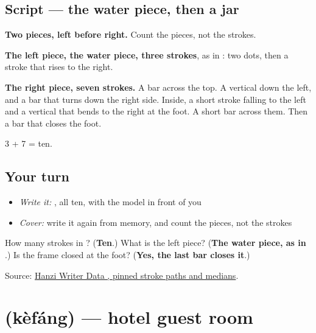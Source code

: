 \subsection*{Script — the water piece, then a jar}

\begin{quote}
\end{quote}

\textbf{Two pieces, left before right.} Count the pieces, not the strokes.

\textbf{The left piece, the water piece, three strokes}, as in : two dots, then a stroke that rises to the right.

\textbf{The right piece, seven strokes.} A bar across the top. A vertical down the left, and a bar that turns down the right side. Inside, a short stroke falling to the left and a vertical that bends to the right at the foot. A short bar across them. Then a bar that closes the foot.

3 + 7 = ten.

\subsection*{Your turn}
\begin{itemize}
\raggedright
  \item \emph{Write it:} , all ten, with the model in front of you
  \item \emph{Cover:} write it again from memory, and count the pieces, not the strokes
\end{itemize}

\begin{tcolorbox}[breakable,colback=teal!4,colframe=teal!35!black,title={Before you move on}]
How many strokes in ? (\textbf{Ten}.) What is the left piece? (\textbf{The water piece, as in }.) Is the frame closed at the foot? (\textbf{Yes, the last bar closes it}.)

Source: \href{https://raw.githubusercontent.com/chanind/hanzi-writer-data/68d10a4b21150cae5e1ebbd223eed289cf32d90c/data/\%E9\%85\%92.json}{Hanzi Writer Data , pinned stroke paths and medians}.
\end{tcolorbox}
\section[\texorpdfstring{\zh{客房} (kèfáng)}{客房 (kèfáng)}]{ (kèfáng) — hotel guest room}

